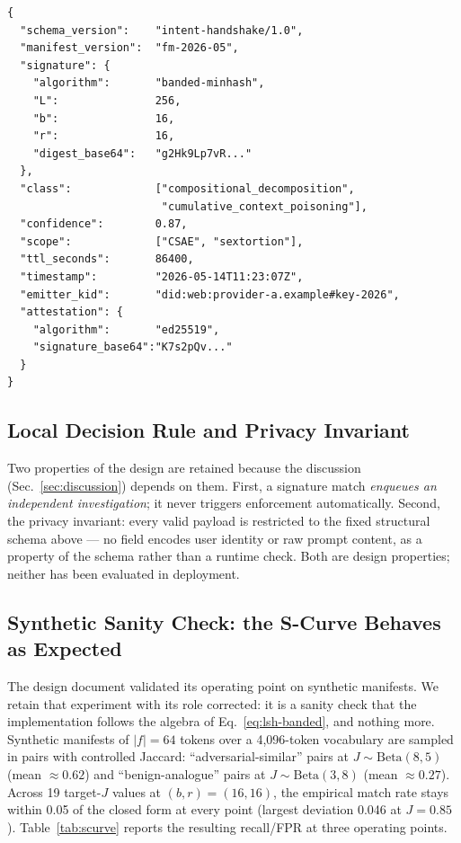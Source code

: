 \documentclass[11pt]{article}
\begin{document}
\begin{lstlisting}[language=jsonpretty, label={lst:payload}, caption={Signal payload specified by the design under test. All fields are structural; no raw prompt content or user identifier appears. Retained as design context.}]
{
  "schema_version":    "intent-handshake/1.0",
  "manifest_version":  "fm-2026-05",
  "signature": {
    "algorithm":       "banded-minhash",
    "L":               256,
    "b":               16,
    "r":               16,
    "digest_base64":   "g2Hk9Lp7vR..."
  },
  "class":             ["compositional_decomposition",
                        "cumulative_context_poisoning"],
  "confidence":        0.87,
  "scope":             ["CSAE", "sextortion"],
  "ttl_seconds":       86400,
  "timestamp":         "2026-05-14T11:23:07Z",
  "emitter_kid":       "did:web:provider-a.example#key-2026",
  "attestation": {
    "algorithm":       "ed25519",
    "signature_base64":"K7s2pQv..."
  }
}
\end{lstlisting}

\subsection{Local Decision Rule and Privacy Invariant}
\label{sec:decision}
Two properties of the design are retained because the discussion (Sec.~\ref{sec:discussion}) depends on them. First, a signature match \emph{enqueues an independent investigation}; it never triggers enforcement automatically. Second, the privacy invariant: every valid payload is restricted to the fixed structural schema above --- no field encodes user identity or raw prompt content, as a property of the schema rather than a runtime check. Both are design properties; neither has been evaluated in deployment.

\subsection{Synthetic Sanity Check: the S-Curve Behaves as Expected}
\label{sec:synthetic}

The design document validated its operating point on synthetic manifests. We retain that experiment with its role corrected: it is a sanity check that the implementation follows the algebra of Eq.~\eqref{eq:lsh-banded}, and nothing more. Synthetic manifests of $|f| = 64$ tokens over a 4{,}096-token vocabulary are sampled in pairs with controlled Jaccard: ``adversarial-similar'' pairs at $J \sim \mathrm{Beta}(8,5)$ (mean $\approx 0.62$) and ``benign-analogue'' pairs at $J \sim \mathrm{Beta}(3,8)$ (mean $\approx 0.27$). Across 19 target-$J$ values at $(b,r) = (16,16)$, the empirical match rate stays within 0.05 of the closed form at every point (largest deviation 0.046 at $J = 0.85$). Table~\ref{tab:scurve} reports the resulting recall/FPR at three operating points.
\end{document}
